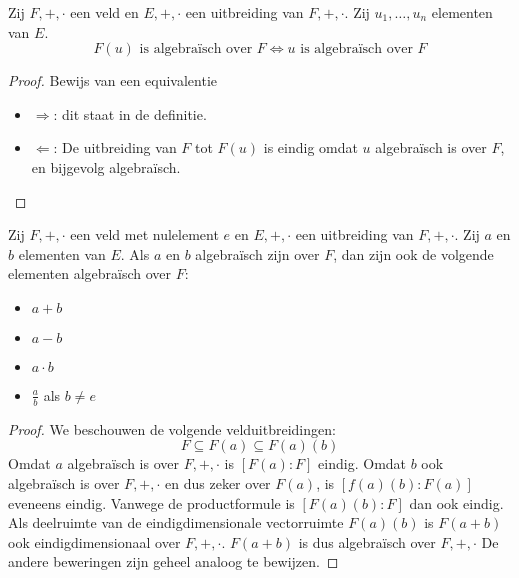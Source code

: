 \documentclass[main.tex]{subfiles}
\begin{document}
\begin{st}
\label{st:element-asa-uitbreiding-algebraisch}
  Zij $F,+,\cdot$ een veld en $E,+,\cdot$ een uitbreiding van $F,+,\cdot$.
  Zij $u_{1},\dotsc,u_{n}$ elementen van $E$.
  \[ F(u) \text{ is algebra\"isch over } F \Leftrightarrow u \text{ is algebra\"isch over } F \]

  \begin{proof}
    Bewijs van een equivalentie
    \begin{itemize}
    \item $\Rightarrow$: dit staat in de definitie.
    \item $\Leftarrow$: De uitbreiding van $F$ tot $F(u)$ is eindig omdat $u$ algebra\"isch is over $F$, en bijgevolg algebra\"isch.
    \end{itemize}
  \end{proof}
\end{st}

\begin{st}
  \examen
  Zij $F,+,\cdot$ een veld met nulelement $e$ en $E,+,\cdot$ een uitbreiding van $F,+,\cdot$.
  Zij $a$ en $b$ elementen van $E$.
  Als $a$ en $b$ algebra\"isch zijn over $F$, dan zijn ook de volgende elementen algebra\"isch over $F$:
  \begin{itemize}
  \item $a+b$
  \item $a-b$
  \item $a\cdot b$
  \item $\frac{a}{b}$ als $b \neq e$
  \end{itemize}

  \begin{proof}
    We beschouwen de volgende velduitbreidingen:
    \[
    F \subseteq F(a) \subseteq F(a)(b)
    \]
    Omdat $a$ algebra\"isch is over $F,+,\cdot$ is $[F(a):F]$ eindig.
    Omdat $b$ ook algebra\"isch is over $F,+,\cdot$ en dus zeker over $F(a)$, is $[f(a)(b):F(a)]$ eveneens eindig.
    Vanwege de productformule is $[F(a)(b):F]$ dan ook eindig.
    Als deelruimte van de eindigdimensionale vectorruimte $F(a)(b)$ is $F(a+b)$ ook eindigdimensionaal over $F,+,\cdot$. $F(a+b)$ is dus algebra\"isch over $F,+,\cdot$
    De andere beweringen zijn geheel analoog te bewijzen.
  \end{proof}
\end{st}
\end{document}
